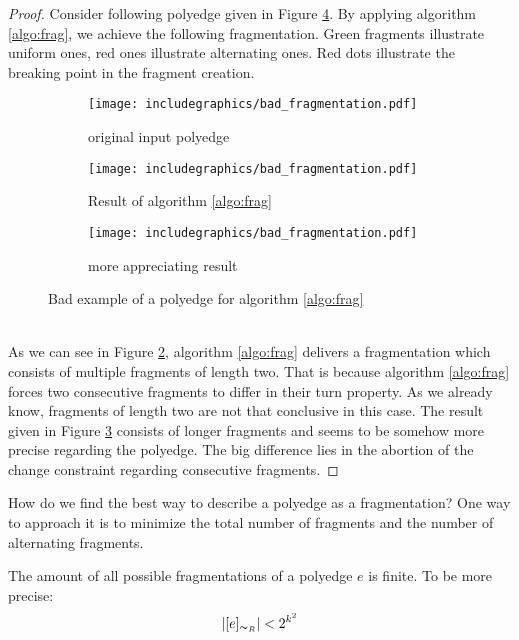 \begin{proof}
	Consider following polyedge given in Figure \ref{im:bad_frag}. By applying algorithm \ref{algo:frag}, we achieve the following fragmentation. Green fragments illustrate uniform ones, red ones illustrate alternating ones. Red dots illustrate the breaking point in the fragment creation.
	\\
	\begin{figure}[h]
		\centering
		\begin{subfigure}{0.3\textwidth}
			\centering
			\texttt{[image: includegraphics/bad\_fragmentation.pdf]}
			\caption{original input polyedge}\label{im:bad_frag1}
		\end{subfigure}
		\begin{subfigure}{0.3\textwidth}
			\centering
			\texttt{[image: includegraphics/bad\_fragmentation.pdf]}
			
			\caption{Result of algorithm \ref{algo:frag}}\label{im:bad_frag2}
		\end{subfigure}
		\begin{subfigure}{0.3\textwidth}
			\centering
			\texttt{[image: includegraphics/bad\_fragmentation.pdf]}
			
			\caption{more appreciating result}\label{im:bad_frag3}
		\end{subfigure}
		\caption{Bad example of a polyedge for algorithm \ref{algo:frag}}
		\label{im:bad_frag}
	\end{figure}
	\\
	As we can see in Figure \ref{im:bad_frag2}, algorithm \ref{algo:frag} delivers a fragmentation which consists of multiple fragments of length two. That is because algorithm \ref{algo:frag} forces two consecutive fragments to differ in their turn property. As we already know, fragments of length two are not that conclusive in this case. The result given in Figure \ref{im:bad_frag3} consists of longer fragments and seems to be somehow more precise regarding the polyedge. The big difference lies in the abortion of the change constraint regarding consecutive fragments.
\end{proof}
How do we find the best way to describe a polyedge as a fragmentation? One way to approach it is to minimize the total number of fragments and the number of alternating fragments.
\begin{lemma}
	The amount of all possible fragmentations of a polyedge $e$ is finite. To be more precise: $$|[e]_{\thicksim_R}| < 2^{k^2}$$
\end{lemma}
